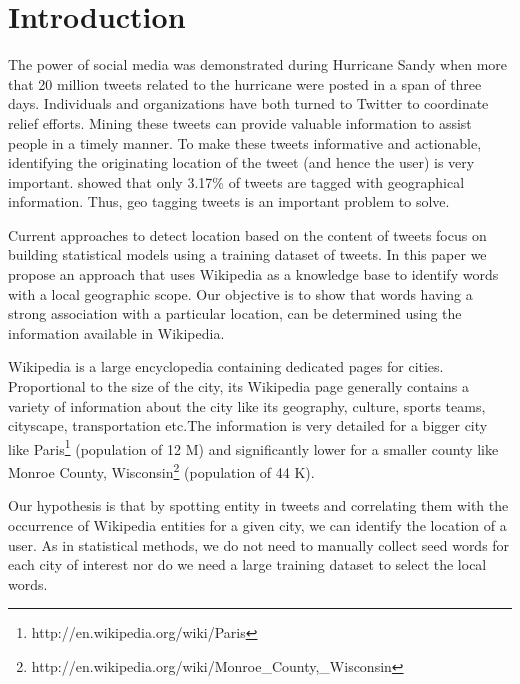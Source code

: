 \section{Introduction}
\label{sec:Introduction}

The power of social media was demonstrated during Hurricane Sandy when more that 20 million tweets related to the hurricane were posted in a span of three days. Individuals and organizations have both turned to Twitter to coordinate relief efforts. Mining these tweets can provide valuable information to assist people in a timely manner\cite{purohit2013emergency}. To make these tweets informative and actionable, identifying the originating location of the tweet (and hence the user) is very important. \cite{morstatter2013sample} showed that only 3.17\% of tweets are tagged with geographical information. Thus, geo tagging tweets is an important problem to solve.

Current approaches to detect location based on the content of tweets focus on building statistical models using a training dataset of tweets. In this paper we propose an approach that uses Wikipedia as a knowledge base to identify words with a local geographic scope. Our objective is to show that words having a strong association with a particular location, can be determined using the information available in Wikipedia.

Wikipedia is a large encyclopedia containing dedicated pages for cities. Proportional to the size of the city, its Wikipedia page generally contains a variety of information about the city like its geography, culture, sports teams, cityscape, transportation etc.The information is very detailed for a bigger city like Paris\footnote{http://en.wikipedia.org/wiki/Paris} (population of 12 M) and significantly lower for a smaller county like Monroe County, Wisconsin\footnote{http://en.wikipedia.org/wiki/Monroe\_County,\_Wisconsin} (population of 44 K). 

Our hypothesis is that by spotting entity in tweets and correlating them with the occurrence of Wikipedia entities for a given city, we can identify the location of a user. As in statistical methods, we do not need to manually collect seed words for each city of interest nor do we need a large training dataset to select the local words.





